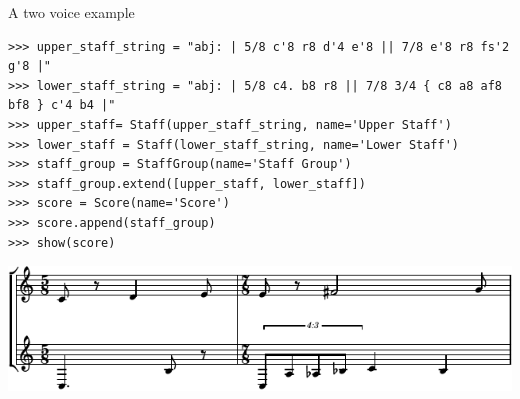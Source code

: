 \begin{frame}[fragile]{A two voice example}

\begin{abjadbookoutput}
\begin{singlespacing}
\vspace{-0.5\baselineskip}
\begin{verbatim}
>>> upper_staff_string = "abj: | 5/8 c'8 r8 d'4 e'8 || 7/8 e'8 r8 fs'2 g'8 |"
>>> lower_staff_string = "abj: | 5/8 c4. b8 r8 || 7/8 3/4 { c8 a8 af8 bf8 } c'4 b4 |"
>>> upper_staff= Staff(upper_staff_string, name='Upper Staff')
>>> lower_staff = Staff(lower_staff_string, name='Lower Staff')
>>> staff_group = StaffGroup(name='Staff Group')
>>> staff_group.extend([upper_staff, lower_staff])
>>> score = Score(name='Score')
>>> score.append(staff_group)
>>> show(score)
\end{verbatim}
\noindent\includegraphics[max width=\textwidth,]{assets/lilypond-e3b1c40a4191d3949ecaa427d7f31b59.pdf}
\end{singlespacing}
\end{abjadbookoutput}

\end{frame}

